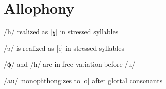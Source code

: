 \section{Allophony}


/h/ realized as [ɣ] in stressed syllables


/ɘ/ is realized as [e] in stressed syllables


/ɸ/ and /h/ are in free variation before /u/

/au/ monophthongizes to [o] after glottal consonants


